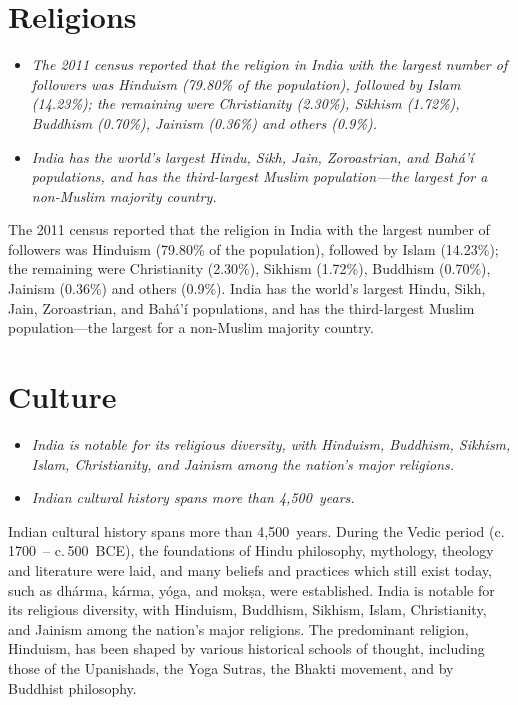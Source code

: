 \section{Religions}\label{religions}

\begin{itemize}
\item
  \emph{The 2011 census reported that the religion in India with the
  largest number of followers was Hinduism (79.80\% of the population),
  followed by Islam (14.23\%); the remaining were Christianity (2.30\%),
  Sikhism (1.72\%), Buddhism (0.70\%), Jainism (0.36\%) and others
  (0.9\%).}
\item
  \emph{India has the world's largest Hindu, Sikh, Jain, Zoroastrian,
  and Bahá'í populations, and has the third-largest Muslim
  population---the largest for a non-Muslim majority country.}
\end{itemize}

The 2011 census reported that the religion in India with the largest
number of followers was Hinduism (79.80\% of the population), followed
by Islam (14.23\%); the remaining were Christianity (2.30\%), Sikhism
(1.72\%), Buddhism (0.70\%), Jainism (0.36\%) and others (0.9\%). India
has the world's largest Hindu, Sikh, Jain, Zoroastrian, and Bahá'í
populations, and has the third-largest Muslim population---the largest
for a non-Muslim majority country.

\section{Culture}\label{culture}

\begin{itemize}
\item
  \emph{India is notable for its religious diversity, with Hinduism,
  Buddhism, Sikhism, Islam, Christianity, and Jainism among the nation's
  major religions.}
\item
  \emph{Indian cultural history spans more than 4,500~years.}
\end{itemize}

Indian cultural history spans more than 4,500~years. During the Vedic
period (c. 1700~-- c. 500~BCE), the foundations of Hindu philosophy,
mythology, theology and literature were laid, and many beliefs and
practices which still exist today, such as dhárma, kárma, yóga, and
mokṣa, were established. India is notable for its religious diversity,
with Hinduism, Buddhism, Sikhism, Islam, Christianity, and Jainism among
the nation's major religions. The predominant religion, Hinduism, has
been shaped by various historical schools of thought, including those of
the Upanishads, the Yoga Sutras, the Bhakti movement, and by Buddhist
philosophy.

